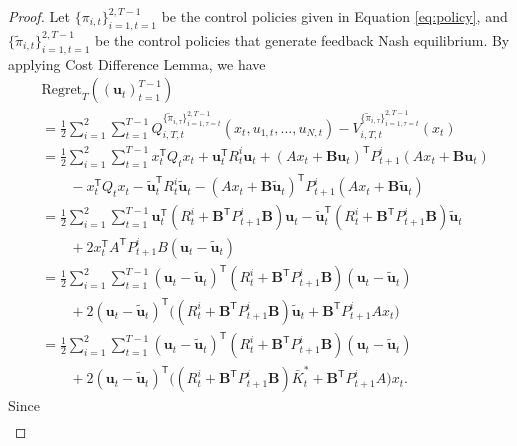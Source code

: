\documentclass[letterpaper, 10 pt, conference]{ieeeconf}  %
\newcommand{\contTilde}[1]{\mathbf{\tilde{#1}}}
\newcommand{\transpose}{\mathsf{T}}
\begin{document}
\begin{proof}
Let $\{\pi_{i,t}\}_{i=1,t=1}^{2,T-1}$ be the control policies given in Equation \eqref{eq:policy}, and $\{\tilde{\pi}_{i,t}\}_{i=1,t=1}^{2,T-1}$ be the control policies that generate feedback Nash equilibrium.
By applying Cost Difference Lemma, we have
\begin{align*}
    &\text{Regret}_{T}((\mathbf{u}_{t})_{t=1}^{T-1})\\
    &= \frac{1}{2}\sum_{i=1}^{2}\sum_{t=1}^{T-1} Q_{i,T,t}^{\{\tilde{\pi}_{i,\tau}\}_{i=1,\tau=t}^{2,T-1}}(x_{t},u_{1,t},...,u_{N,t}) -  V_{i,T,t}^{\{\tilde{\pi}_{i,\tau}\}_{i=1,\tau=t}^{2,T-1}}(x_{t})\\
    &= \frac{1}{2}\sum_{i=1}^{2}\sum_{t=1}^{T-1} x_{t}^{\transpose}Q_{t}x_{t} + \mathbf{u}_{t}^{\transpose}R_{t}^{i}\mathbf{u}_{t} + (Ax_{t}+\mathbf{B}\mathbf{u}_{t})^{\transpose}P_{t+1}^{i}(Ax_{t}+\mathbf{B}\mathbf{u}_{t})\\
    &\qquad - x_{t}^{\transpose}Q_{t}x_{t} - \contTilde{u}_{t}^{\transpose}R_{t}^{i}\contTilde{u}_{t} - (Ax_{t}+\mathbf{B}\contTilde{u}_{t})^{\transpose}P_{t+1}^{i}(Ax_{t}+\mathbf{B}\contTilde{u}_{t})\\
    &= \frac{1}{2}\sum_{i=1}^{2}\sum_{t=1}^{T-1} \mathbf{u}_{t}^{\transpose}(R_{t}^{i}+\mathbf{B}^{\transpose}P_{t+1}^{i}\mathbf{B})\mathbf{u}_{t}-\contTilde{u}_{t}^{\transpose}(R_{t}^{i}+\mathbf{B}^{\transpose}P_{t+1}^{i}\mathbf{B})\contTilde{u}_{t} \\
    &\qquad+ 2x_{t}^{\transpose}A^{\transpose}P_{t+1}^{i}B(\mathbf{u}_{t}-\contTilde{u}_{t})\\
    &= \frac{1}{2}\sum_{i=1}^{2}\sum_{t=1}^{T-1} (\mathbf{u}_{t}-\contTilde{u}_{t})^{\transpose}(R_{t}^{i}+\mathbf{B}^{\transpose}P_{t+1}^{i}\mathbf{B})(\mathbf{u}_{t}-\contTilde{u}_{t})\\
    &\qquad + 2(\mathbf{u}_{t}-\contTilde{u}_{t})^{\transpose}\bigg((R_{t}^{i}+\mathbf{B}^{\transpose}P_{t+1}^{i}\mathbf{B})\contTilde{u}_{t}+\mathbf{B}^{\transpose}P_{t+1}^{i}Ax_{t}\bigg)\\
    &= \frac{1}{2}\sum_{i=1}^{2}\sum_{t=1}^{T-1} (\mathbf{u}_{t}-\contTilde{u}_{t})^{\transpose}(R_{t}^{i}+\mathbf{B}^{\transpose}P_{t+1}^{i}\mathbf{B})(\mathbf{u}_{t}-\contTilde{u}_{t})\\
    &\qquad + 2(\mathbf{u}_{t}-\contTilde{u}_{t})^{\transpose}\bigg((R_{t}^{i}+\mathbf{B}^{\transpose}P_{t+1}^{i}\mathbf{B})\bar{K}_{t}^{*}+\mathbf{B}^{\transpose}P_{t+1}^{i}A\bigg)x_{t}.
\end{align*}
Since
\begin{align*}

\end{align*}
\end{proof}
\end{document}
